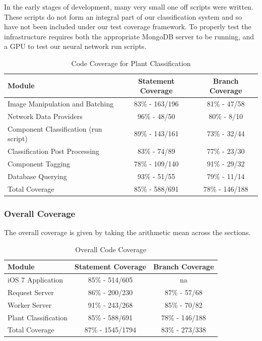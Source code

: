 \documentclass[a4paper,11pt]{article}
\begin{document}
In the early stages of development, many very small one off scripts were written. These scripts do not form an integral part of our classification system and so have not been included under our test coverage framework. To properly test the infrastructure requires both the appropriate MongoDB server to be running, and a GPU to test our neural network run scripts.

\begin{table}[h]
   \centering
    \begin{tabular}{|l|cc|}
    \hline
    Module                                & Statement Coverage  & Branch Coverage \\ \hline
    Image Manipulation and Batching       & 83\% - 163/196      & 81\% - 47/58    \\
    Network Data Providers                & 96\% - 48/50       & 80\% - 8/10    \\
    Component Classification (run script) & 89\% - 143/161      & 73\% - 32/44    \\
    Classification Post Processing        & 83\% - 74/89        & 77\% - 23/30    \\
    Component Tagging                     & 78\% - 109/140      & 91\% - 29/32    \\
    Database Querying                     & 93\% - 51/55        & 79\% - 11/14    \\ \hline
    Total Coverage                        & 85\% - 588/691      & 78\% - 146/188           \\ \hline
    \end{tabular}
    \caption {Code Coverage for Plant Classification}
\end{table}

\subsubsection{Overall Coverage}

The overall coverage is given by taking the arithmetic mean across the sections.

\begin{table}[h]
   \centering
    \begin{tabular}{|l|cc|}
    \hline
    Module                                & Statement Coverage  & Branch Coverage \\ \hline
    iOS 7 Application                       & 85\% - 514/605    & na		  \\
    Request Server                          & 86\% - 200/230   & 87\%	- 57/68	\\
    Worker Server                           & 91\% - 243/268    & 85\%  - 70/82  \\
    Plant Classification                    & 85\% - 588/691    & 78\%	- 146/188	\\ \hline
    Total Coverage                          & 87\% - 1545/1794  & 83\%	- 273/338	\\ \hline
    \end{tabular}
    \caption {Overall Code Coverage}
\end{table}
\end{document}

